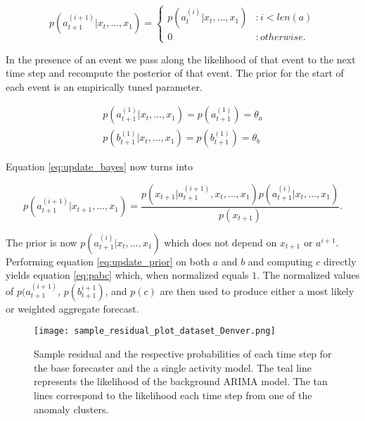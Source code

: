 \begin{equation}
	p(a_{t + 1}^{(i + 1)} | x_{t}, \ldots, x_{1}) = 
		\begin{cases}
			p(a_{t}^{(i)}|x_{t}, \ldots, x_{1}) & : i < len(a) \\
			0 & : otherwise.
		\end{cases}
\end{equation}

In the presence of an event we pass along the likelihood of that event to the next time step and recompute the posterior of that event.  The prior for the start of each event is an empirically tuned parameter.  

\begin{equation}
	\begin{split}
		p(a_{t + 1}^{(1)}|x_{t}, \ldots, x_{1}) = p(a_{t + 1}^{(1)}) = \theta_a \\
		p(b_{t + 1}^{(1)}|x_{t}, \ldots, x_{1}) = p(b_{t + 1}^{(1)}) = \theta_b
	\end{split}
\end{equation}

\noindent
Equation \ref{eq:update_bayes} now turns into 

\begin{equation}
p(a_{t + 1}^{(i + 1)}|x_{t + 1}, \ldots, x_{1}) =
		\frac{p(x_{t + 1}|a^{(i + 1)}_{t + 1}, x_{t}, \ldots, x_{1}) p(a_{t + 1}^{(i)}|x_{t}, \ldots, x_{1})}
	       {p(x_{t + 1})}.
\label{eq:update_prior}
\end{equation}

\noindent
The prior is now $p(a_{t + 1}^{(i)}|x_{t}, \ldots, x_{1})$ which does not depend on $x_{t + 1}$ or $a^{i + 1}$.  Performing equation \ref{eq:update_prior} on both $a$ and $b$ and computing $c$ directly yields equation \ref{eq:pabc} which, when normalized equals $1$.  The normalized values of $p(a_{t + 1}^{(i + 1)}$, $p(b_{t + 1}^{i + 1})$, and $p(c)$ are then used to produce either a most likely or weighted aggregate forecast.


\begin{figure}[!t]
	\begin{center}
		\texttt{[image: sample\_residual\_plot\_dataset\_Denver.png]}
	\end{center}
	\caption{Sample residual and the respective probabilities of each time step for the base forecaster and the a single activity model.  The teal line represents the likelihood of the background ARIMA model.  The tan lines correspond to the likelihood each time step from one of the anomaly clusters.}
	\label{fig:sample_abcf_residual}
\end{figure}

